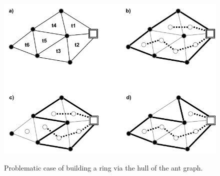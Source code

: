\begin{figure}[h]
	\begin{centering}
		{\includegraphics[scale=0.9]{figures/approach/backandforth.pdf}}
		\caption{Problematic case of building a ring via the hull of the ant graph.}
		\label{fig:backandforth}
	\end{centering}
\end{figure}
